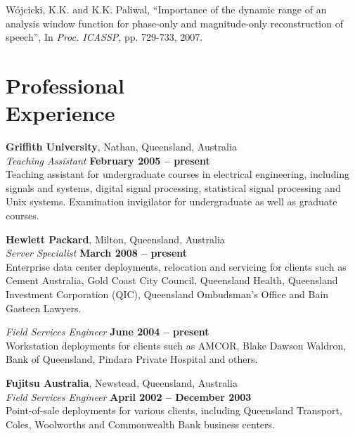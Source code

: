 \documentclass[margin,line]{resumeFormat2}
\begin{document}
\begin{resumeFormat2}
\vspace{-2mm}
    W\'ojcicki, K.K. and K.K. Paliwal,
    ``Importance of the dynamic range of an analysis window function for phase-only and magnitude-only reconstruction of speech'',
    In \textsl{Proc. ICASSP}, pp. 729-733, 2007.



    \section{\mysidestyle Professional\\Experience}

    \textbf{Griffith University}, Nathan, Queensland, Australia \vspace{2mm}\\\vspace{1mm}%
    \textsl{Teaching Assistant} \hfill \textbf{February 2005 -- present}\\
    Teaching assistant for undergraduate courses in electrical engineering,
    including signals and systems, digital signal processing, 
    statistical signal processing and Unix systems.
    Examination invigilator for undergraduate as well as graduate courses.


    \textbf{Hewlett Packard}, Milton, Queensland, Australia \vspace{2mm}\\\vspace{1mm}%
    \textsl{Server Specialist} \hfill \textbf{March 2008 -- present}\\
    Enterprise data center deployments, relocation and servicing
    for clients such as Cement Australia, Gold Coast City Council, Queensland Health,
    Queensland Investment Corporation (QIC), Queensland Ombudsman's Office and Bain Gasteen Lawyers.

    \textsl{Field Services Engineer} \hfill \textbf{June 2004 -- present}\vspace{1.5mm}\\\vspace{0mm}%
    Workstation deployments for clients such as AMCOR, 
    Blake Dawson Waldron, Bank of Queensland, Pindara Private Hospital and others. 

    \textbf{Fujitsu Australia}, Newstead, Queensland, Australia \vspace{2mm}\\\vspace{1mm}%
    \textsl{Field Services Engineer} \hfill \textbf{April 2002 -- December 2003}\\
    Point-of-sale deployments for various clients, 
    including Queensland Transport, Coles, Woolworths and Commonwealth Bank business centers. 




\end{resumeFormat2}
\end{document}
